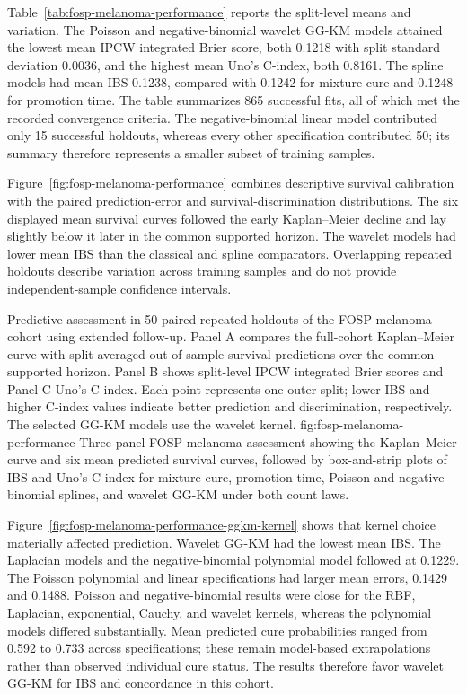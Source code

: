 
Table~\ref{tab:fosp-melanoma-performance} reports the split-level means
and variation. The Poisson and negative-binomial wavelet GG-KM models
attained the lowest mean IPCW integrated Brier score, both 0.1218 with
split standard deviation 0.0036, and the highest mean Uno's C-index,
both 0.8161. The spline models had mean IBS 0.1238, compared with 0.1242
for mixture cure and 0.1248 for promotion time.
The table summarizes 865 successful fits, all of which met the recorded
convergence criteria. The negative-binomial linear model contributed
only 15 successful holdouts, whereas every other specification
contributed 50; its summary therefore represents a smaller subset of
training samples.

Figure~\ref{fig:fosp-melanoma-performance} combines descriptive survival
calibration with the paired prediction-error and survival-discrimination
distributions. The six displayed mean survival curves followed the early
Kaplan--Meier decline and lay slightly below it later in the common
supported horizon. The wavelet models had lower mean IBS than the
classical and spline comparators. Overlapping repeated
holdouts describe variation across training samples and do not provide
independent-sample confidence intervals.

{Predictive assessment in 50 paired repeated holdouts of the FOSP melanoma
cohort using extended follow-up. Panel A compares the full-cohort
Kaplan--Meier curve with split-averaged out-of-sample survival predictions
over the common supported horizon. Panel B shows split-level IPCW
integrated Brier scores and Panel C Uno's C-index. Each point represents one
outer split; lower IBS and higher C-index values indicate better
prediction and discrimination, respectively. The selected GG-KM models
use the wavelet kernel.}
{fig:fosp-melanoma-performance}
{Three-panel FOSP melanoma assessment showing the Kaplan--Meier curve and
six mean predicted survival curves, followed by box-and-strip plots of
IBS and Uno's C-index for mixture cure, promotion time, Poisson and
negative-binomial splines, and wavelet GG-KM under both count laws.}

Figure~\ref{fig:fosp-melanoma-performance-ggkm-kernel} shows that kernel
choice materially affected prediction. Wavelet GG-KM had the lowest mean
IBS. The Laplacian models and the negative-binomial polynomial model
followed at 0.1229. The Poisson polynomial and
linear specifications had larger mean errors, 0.1429 and 0.1488.
Poisson and negative-binomial results were close for the RBF, Laplacian,
exponential, Cauchy, and wavelet kernels, whereas the polynomial models
differed substantially. Mean predicted cure probabilities ranged from
0.592 to 0.733 across specifications; these remain model-based
extrapolations rather than observed individual cure status. The results
therefore favor wavelet GG-KM for IBS and concordance in this cohort.

